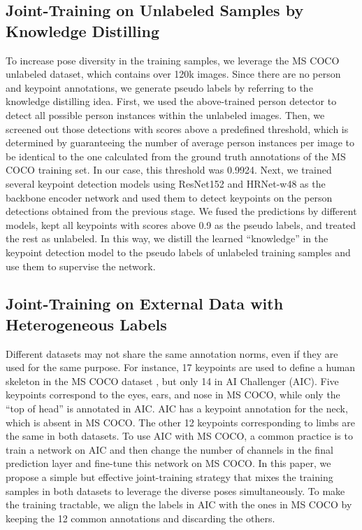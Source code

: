 \documentclass[twocolumn]{svjour3}          \smartqed  \usepackage{natbib}
\begin{document}
\subsection{Joint-Training on Unlabeled Samples by Knowledge Distilling}
\label{subsec:unlabel}
To increase pose diversity in the training samples, we leverage the MS COCO unlabeled dataset, which contains over 120k images. Since there are no person and keypoint annotations, we generate pseudo labels by referring to the knowledge distilling idea. First, we used the above-trained person detector to detect all possible person instances within the unlabeled images. Then, we screened out those detections with scores above a predefined threshold, which is determined by guaranteeing the number of average person instances per image to be identical to the one calculated from the ground truth annotations of the MS COCO training set. In our case, this threshold was 0.9924. Next, we trained several keypoint detection models using ResNet152 and HRNet-w48 as the backbone encoder network and used them to detect keypoints on the person detections obtained from the previous stage. We fused the predictions by different models, kept all keypoints with scores above 0.9 as the pseudo labels, and treated the rest as unlabeled. In this way, we distill the learned ``knowledge'' in the keypoint detection model to the pseudo labels of unlabeled training samples and use them to supervise the network.

\subsection{Joint-Training on External Data with Heterogeneous Labels}
\label{subsec:jointtraining}
Different datasets may not share the same annotation norms, even if they are used for the same purpose. For instance, 17 keypoints are used to define a human skeleton in the MS COCO dataset \citep{lin2014microsoft}, but only 14 in AI Challenger (AIC). Five keypoints correspond to the eyes, ears, and nose in MS COCO, while only the ``top of head'' is annotated in AIC. AIC has a keypoint annotation for the neck, which is absent in MS COCO. The other 12 keypoints corresponding to limbs are the same in both datasets. To use AIC with MS COCO, a common practice is to train a network on AIC and then change the number of channels in the final prediction layer and fine-tune this network on MS COCO. In this paper, we propose a simple but effective joint-training strategy that mixes the training samples in both datasets to leverage the diverse poses simultaneously. To make the training tractable, we align the labels in AIC with the ones in MS COCO by keeping the 12 common annotations and discarding the others.
\end{document}

